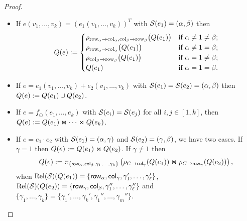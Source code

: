 \begin{proof}
\begin{itemize}

  \item If $e(v_1,\ldots,v_k)=(e_1(v_1,\ldots,v_k))^T$ with $\mathcal{S} (e_1)=(\alpha, \beta)$ then \[
Q(e) :=
\begin{cases}
\rho_{\mathrm{row}_\alpha \to \mathrm{col}_\alpha,\mathrm{col}_\beta \to \mathrm{row}_\beta}\bigl(Q(e_1)\bigr) & \text{if } \alpha \neq 1 \neq \beta; \cr
\rho_{\mathrm{row}_\alpha \to \mathrm{col}_\alpha}\bigl(Q(e_1)\bigr) & \text{if } \alpha \neq 1 = \beta; \cr
\rho_{\mathrm{col}_\beta \to \mathrm{row}_\beta}\bigl(Q(e_1)\bigr) & \text{if } \alpha = 1 \neq \beta; \cr
Q(e_1) & \text{if } \alpha = 1 = \beta.
\end{cases}
\]
  \item If $e=e_1(v_1,\ldots,v_k)+e_2(v_1,\ldots,v_k)$ with $\mathcal{S} (e_1)=\mathcal{S} (e_2)=(\alpha, \beta)$ then $Q (e):=Q (e_1)\cup Q (e_2)$.

  \item If $e=f_\odot(e_1,\ldots, e_k)$ with $\mathcal{S}(e_i)=\mathcal{S}(e_j)$ for all $i,j\in[1,k]$, then $Q(e):=Q(e_1)\Join \cdots \Join Q(e_k)$.

  \item If $e=e_1\cdot e_2$ with $\mathcal{S} (e_1)=(\alpha, \gamma)$ and $\mathcal{S} (e_2)=(\gamma, \beta)$, we have two cases. If $\gamma = 1$ then $Q (e):=Q (e_1)\Join Q (e_2)$.
If $\gamma\neq 1$ then
$$
Q (e) := \pi_{\lbrace \mathsf{row}_{\alpha},\mathsf{col}_{\beta}, \gamma_1,\ldots,\gamma_k \rbrace}\left(\rho_{C\to \mathsf{col}_\gamma}(Q (e_1))\Join \rho_{C\to \mathsf{row}_\gamma}(Q (e_2)) \right),
$$
when $\text{Rel}(\mathcal{S})(Q(e_1))=\{\mathsf{row}_\alpha,\mathsf{col}_\gamma,\gamma_1',\ldots,\gamma_{\ell}'\}$,
$\text{Rel}(\mathcal{S})(Q(e_2))=\{\mathsf{row}_\gamma,\mathsf{col}_\beta,\gamma_1'',\ldots,\gamma_{\ell}''\}$ and $\{\gamma_1,\ldots,\gamma_k\}=\{\gamma_1',\ldots,\gamma_k',\gamma_1'',\ldots,\gamma_m''\}$.



\end{itemize}
\end{proof}

